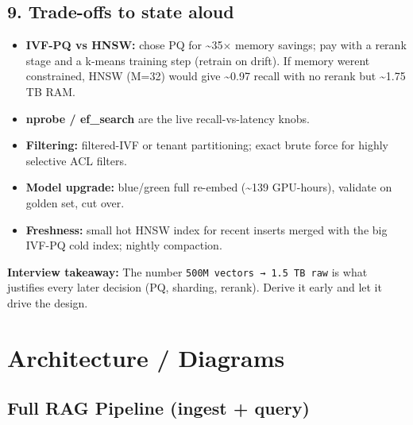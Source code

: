 \documentclass[11pt]{article}
\providecommand{\tightlist}{\setlength{\itemsep}{1pt}\setlength{\parskip}{0pt}}
\begin{document}
\subsection{9. Trade-offs to state aloud}\label{9-trade-offs-to-state-aloud}

\begin{itemize}
\tightlist
\item
  \textbf{IVF-PQ vs HNSW:} chose PQ for \textasciitilde35\(\times\) memory savings; pay with a rerank stage and a k-means training step (retrain on drift). If memory weren\textquotesingle t constrained, HNSW (M=32) would give \textasciitilde0.97 recall with no rerank but \textasciitilde1.75 TB RAM.
\item
  \textbf{nprobe / ef\_search} are the live recall-vs-latency knobs.
\item
  \textbf{Filtering:} filtered-IVF or tenant partitioning; exact brute force for highly selective ACL filters.
\item
  \textbf{Model upgrade:} blue/green full re-embed (\textasciitilde139 GPU-hours), validate on golden set, cut over.
\item
  \textbf{Freshness:} small hot HNSW index for recent inserts merged with the big IVF-PQ cold index; nightly compaction.
\end{itemize}

\textbf{Interview takeaway:} The number \texttt{500M\ vectors\ →\ 1.5\ TB\ raw} is what justifies every later decision (PQ, sharding, rerank). Derive it early and let it drive the design.

\section{Architecture / Diagrams}\label{architecture--diagrams}

\subsection{Full RAG Pipeline (ingest + query)}\label{full-rag-pipeline-ingest--query}

\setcodelang{}
\end{document}
